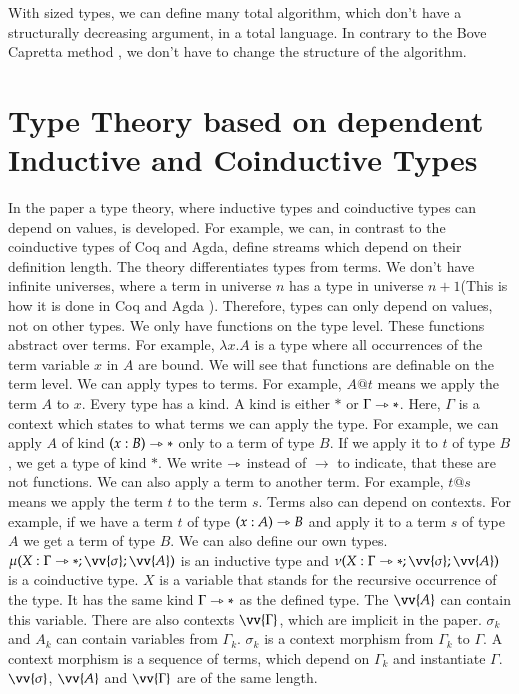 \documentclass[a4paper,cleardoubleempty,BCOR1cm]{scrbook}
\begin{document}
With sized types, we can define many total algorithm, which don't have a
structurally decreasing argument, in a total language. In contrary to the
Bove Capretta method \cite{bove2005modelling}, we don't have to change the structure of the
algorithm.

\chapter{Type Theory based on dependent Inductive and Coinductive Types}
\label{sec:org6a89375}
In the paper \cite{basold2016type} a type theory, where inductive types and
coinductive types can depend on values, is developed. For example, we can, in
contrast to the coinductive types of Coq and Agda, define streams which depend
on their definition length. The theory differentiates types from terms. We
don't have infinite universes, where a term in universe \(n\) has a type in
universe \(n+1\)(This is how it is done in Coq \cite{sozeau2014universe} and Agda
\cite{agdadocuniverselevels}). Therefore, types can only depend on values, not on
other types. We only have functions on the type level. These functions abstract
over terms. For example, \(\lambda x.A\) is a type where all occurrences of the
term variable \(x\) in \(A\) are bound.  We will see that functions are definable
on the term level. We can apply types to terms. For example, \(A @ t\) means we
apply the term \(A\) to \(x\). Every type has a kind. A kind is either \(*\) or
\(\Gamma\rightarrowtriangle*\). Here, \(\Gamma\) is a context which states to what terms we can
apply the type. For example, we can apply \(A\) of kind \((x:B)\rightarrowtriangle*\) only to a
term of type \(B\). If we apply it to \(t\) of type \(B\), we get a type of kind
\(*\). We write \(\rightarrowtriangle\) instead of \(\rightarrow\) to indicate, that these are not
functions. We can also apply a term to another term. For example, \(t@s\) means
we apply the term \(t\) to the term \(s\).  Terms also can depend on contexts.
For example, if we have a term \(t\) of type \((x:A)\rightarrowtriangle B\) and apply it to a term
\(s\) of type \(A\) we get a term of type \(B\).  We can also define our own types.
\(\mu(X:\Gamma\rat*;\vv{\sigma};\vv{A})\) is an inductive type and
\(\nu(X:\Gamma\rat*;\vv{\sigma};\vv{A})\) is a coinductive type. \(X\) is a
variable that stands for the recursive occurrence of the type. It has the
same kind \(\Gamma\rightarrowtriangle*\) as the defined type. The \(\vv{A}\) can contain this
variable. There are also contexts \(\vv{\Gamma}\), which are implicit in the
paper. \(\sigma_k\) and \(A_k\) can contain variables from \(\Gamma_k\). \(\sigma_k\)
is a context morphism from \(\Gamma_k\) to \(\Gamma\). A context morphism is a
sequence of terms, which depend on \(\Gamma_k\) and instantiate \(\Gamma\).
\(\vv{\sigma}\), \(\vv{A}\) and \(\vv{\Gamma}\) are of the same length.
\end{document}
